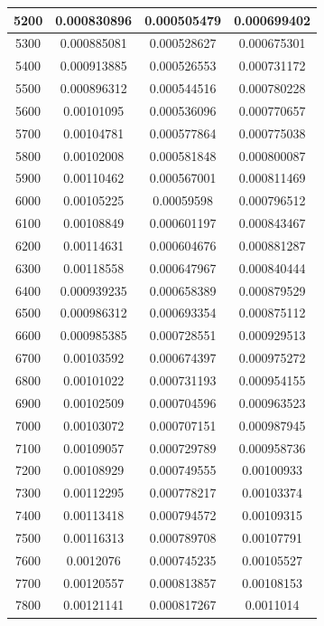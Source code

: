 \documentclass[11pt,spanish]{article} %
\begin{document}
\begin{center}
\begin{longtable}{|c|c|c|c|}
5200 & 0.000830896 & 0.000505479 & 0.000699402 \\ \hline
5300 & 0.000885081 & 0.000528627 & 0.000675301 \\ \hline
5400 & 0.000913885 & 0.000526553 & 0.000731172 \\ \hline
5500 & 0.000896312 & 0.000544516 & 0.000780228 \\ \hline
5600 & 0.00101095  & 0.000536096 & 0.000770657 \\ \hline
5700 & 0.00104781  & 0.000577864 & 0.000775038 \\ \hline
5800 & 0.00102008  & 0.000581848 & 0.000800087 \\ \hline
5900 & 0.00110462  & 0.000567001 & 0.000811469 \\ \hline
6000 & 0.00105225  & 0.00059598  & 0.000796512 \\ \hline
6100 & 0.00108849  & 0.000601197 & 0.000843467 \\ \hline
6200 & 0.00114631  & 0.000604676 & 0.000881287 \\ \hline
6300 & 0.00118558  & 0.000647967 & 0.000840444 \\ \hline
6400 & 0.000939235 & 0.000658389 & 0.000879529 \\ \hline
6500 & 0.000986312 & 0.000693354 & 0.000875112 \\ \hline
6600 & 0.000985385 & 0.000728551 & 0.000929513 \\ \hline
6700 & 0.00103592  & 0.000674397 & 0.000975272 \\ \hline
6800 & 0.00101022  & 0.000731193 & 0.000954155 \\ \hline
6900 & 0.00102509  & 0.000704596 & 0.000963523 \\ \hline
7000 & 0.00103072  & 0.000707151 & 0.000987945 \\ \hline
7100 & 0.00109057  & 0.000729789 & 0.000958736 \\ \hline
7200 & 0.00108929  & 0.000749555 & 0.00100933  \\ \hline
7300 & 0.00112295  & 0.000778217 & 0.00103374  \\ \hline
7400 & 0.00113418  & 0.000794572 & 0.00109315  \\ \hline
7500 & 0.00116313  & 0.000789708 & 0.00107791  \\ \hline
7600 & 0.0012076   & 0.000745235 & 0.00105527  \\ \hline
7700 & 0.00120557  & 0.000813857 & 0.00108153  \\ \hline
7800 & 0.00121141  & 0.000817267 & 0.0011014   \\ \hline

\end{longtable}
\end{center}
\end{document}

